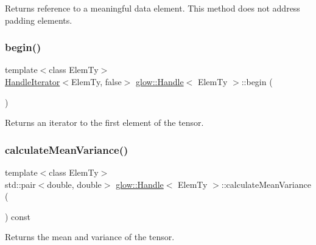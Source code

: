 Returns reference to a meaningful data element. This method does not address padding elements. \mbox{\label{classglow_1_1_handle_a1870bb8d89827d3db93c0bf6500bda1f}} 
\subsubsection{\texorpdfstring{begin()}{begin()}}
{\footnotesize\ttfamily template$<$class Elem\+Ty$>$ \\
\hyperlink{classglow_1_1_handle_iterator}{Handle\+Iterator}$<$Elem\+Ty, false$>$ \hyperlink{classglow_1_1_handle}{glow\+::\+Handle}$<$ Elem\+Ty $>$\+::begin (\begin{DoxyParamCaption}{ }\end{DoxyParamCaption})\hspace{0.3cm}{\ttfamily [inline]}}

\begin{DoxyReturn}{Returns}
an iterator to the first element of the tensor. 
\end{DoxyReturn}
\mbox{\label{classglow_1_1_handle_a542bc11508e42c8e2d2b1d2b07a40e8d}} 
\subsubsection{\texorpdfstring{calculate\+Mean\+Variance()}{calculateMeanVariance()}}
{\footnotesize\ttfamily template$<$class Elem\+Ty$>$ \\
std\+::pair$<$double, double$>$ \hyperlink{classglow_1_1_handle}{glow\+::\+Handle}$<$ Elem\+Ty $>$\+::calculate\+Mean\+Variance (\begin{DoxyParamCaption}{ }\end{DoxyParamCaption}) const\hspace{0.3cm}{\ttfamily [inline]}}

\begin{DoxyReturn}{Returns}
the mean and variance of the tensor. 
\end{DoxyReturn}
\mbox{\label{classglow_1_1_handle_a9fb451dd6a54e840ff39a403a655097b}} 
